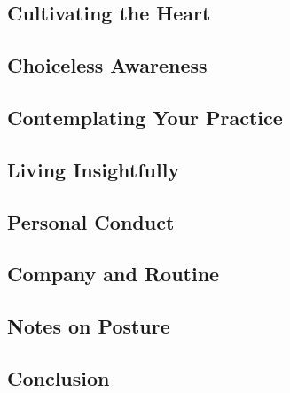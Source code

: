 \documentclass[10pt,twoside,final]{memoir}
\begin{document}
\newpage

\subsection{Cultivating the Heart}


\newpage


\subsection{Choiceless Awareness}


\newpage

\subsection{Contemplating Your Practice}


\newpage

\subsection{Living Insightfully}


\newpage


\subsection{Personal Conduct}


\newpage

\subsection{Company and Routine}


\newpage

\subsection{Notes on Posture}


\newpage

\subsection{Conclusion}

\end{document}
